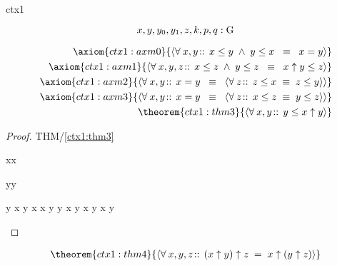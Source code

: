 \documentclass[12pt]{amsart}
\begin{document}
\begin{context}{ctx1}

\newset{\G}

\[ x,y,y_0,y_1,z,k,p,q: \text{G} \]

\precedence{[[\uparrow],[\le]]}
\begin{align}
\axiom{ctx1:axm0}{ 
	\qforall{x,y}{}{ x \le y \1\land y \le x \2\equiv x = y } } 
\\ \axiom{ctx1:axm1}{ 
	\qforall{x,y,z}{}{ x \le z \1\land y \le z \2\equiv 
		x \uparrow y \le z } }
\\ \axiom{ctx1:axm2}{ 
	\qforall{x,y}{}{ x = y \2\equiv \qforall{z}{}{ z \le x \1\equiv z \le y } } }
\\ \axiom{ctx1:axm3}{ 
	\qforall{x,y}{}{ x = y \2\equiv \qforall{z}{}{ x \le z \1\equiv y \le z } } }
\\ \theorem{ctx1:thm3}{ \qforall{x,y}{}{ y \le x \uparrow y } }
\end{align}

\begin{proof}{THM/\ref{ctx1:thm3}}
	\begin{free:var}{x}{x}
	\begin{free:var}{y}{y}
\begin{calculation}
		y \le x \uparrow y
		x \le x \uparrow y
	\2\land	y \le x \uparrow y
	\hint{=}{ \eqref{ctx1:axm1} }
		x \uparrow y \1\le x \uparrow y
	\hint{=}{ \eqref{ctx1:axm0} }
		\true
\end{calculation}
	\end{free:var}
	\end{free:var}
\end{proof}

\begin{align}
\theorem{ctx1:thm4}{ \qforall{x,y,z}{}{ (x \uparrow y) \uparrow z \1= x \uparrow (y \uparrow z) } }
\end{align}


\end{context}
\end{document}
